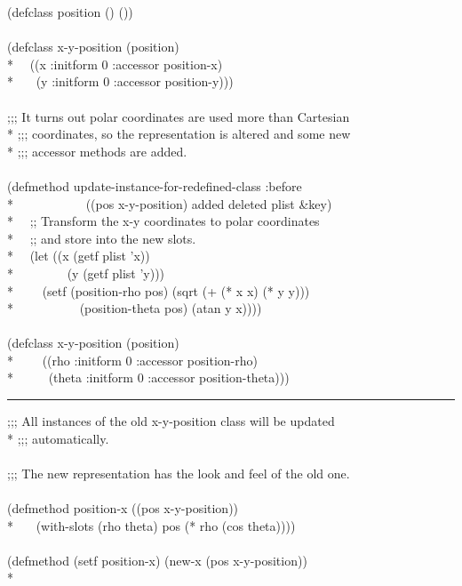 \begin{defun}
\begin{lisp}
(defclass position () ()) \\
\\
(defclass x-y-position (position) \\*
~~((x :initform 0 :accessor position-x) \\*
~~~(y :initform 0 :accessor position-y))) \\
\\
;;; It turns out polar coordinates are used more than Cartesian  \\*
;;; coordinates, so the representation is altered and some new \\*
;;; accessor methods are added. \\
\\
(defmethod update-instance-for-redefined-class :before \\*
~~~~~~~~~~~((pos x-y-position) added deleted plist \&key) \\*
~~;; Transform the x-y coordinates to polar coordinates \\*
~~;; and store into the new slots. \\*
~~(let ((x (getf plist 'x)) \\*
~~~~~~~~(y (getf plist 'y))) \\*
~~~~(setf (position-rho pos) (sqrt (+ (* x x) (* y y))) \\*
~~~~~~~~~~(position-theta pos) (atan y x)))) \\
\\
(defclass x-y-position (position) \\*
~~~~((rho :initform 0 :accessor position-rho) \\*
~~~~~(theta :initform 0 :accessor position-theta)))
\end{lisp}
\hrule width 0pt\relax
\begin{lisp}
;;; All instances of the old x-y-position class will be updated \\*
;;; automatically. \\
\\
;;; The new representation has the look and feel of the old one. \\
\\
(defmethod position-x ((pos x-y-position)) \\*
~~~(with-slots (rho theta) pos (* rho (cos theta)))) \\
\\
(defmethod (setf position-x) (new-x (pos x-y-position)) \\*

\end{lisp}
\end{defun}
